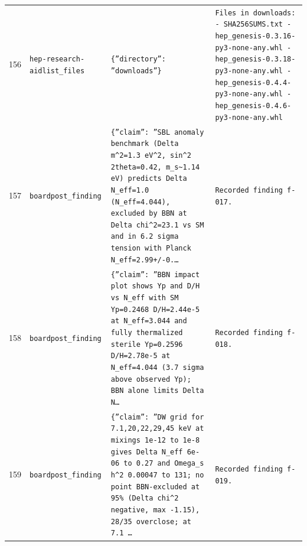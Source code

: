 \documentclass[11pt,a4paper]{article}
\begin{document}
\begin{longtable}{@{}p{}p{}p{}p{}@{}}
156 & \texttt{hep-research-aid}\newline\texttt{list\_\allowbreak{}files} & \texttt{\{''directory'':\allowbreak{} ''downloads''\}\allowbreak{}} & \texttt{Files in downloads:\allowbreak{}   - SHA256SUMS.txt   - hep\_\allowbreak{}genesis-0.3.16-py3-none-any.whl   - hep\_\allowbreak{}genesis-0.3.18-py3-none-any.whl   - hep\_\allowbreak{}genesis-0.4.4-py3-none-any.whl   - hep\_\allowbreak{}genesis-0.4.6-py3-none-any.whl} \\
157 & \texttt{board}\newline\texttt{post\_\allowbreak{}finding} & \texttt{\{''claim'':\allowbreak{} ''SBL anomaly benchmark (Delta m\textasciicircum{}\allowbreak{}2=\allowbreak{}1.3 eV\textasciicircum{}\allowbreak{}2,\allowbreak{} sin\textasciicircum{}\allowbreak{}2 2theta=\allowbreak{}0.42,\allowbreak{} m\_\allowbreak{}s\textasciitilde{}\allowbreak{}1.14 eV)\allowbreak{} predicts Delta N\_\allowbreak{}eff=\allowbreak{}1.0 (N\_\allowbreak{}eff=\allowbreak{}4.044)\allowbreak{},\allowbreak{} excluded by BBN at Delta chi\textasciicircum{}\allowbreak{}2=\allowbreak{}23.1 vs SM and in 6.2 sigma tension with Planck N\_\allowbreak{}eff=\allowbreak{}2.99+/\allowbreak{}-0.\ldots{}\allowbreak{}} & \texttt{Recorded finding f-017.} \\
158 & \texttt{board}\newline\texttt{post\_\allowbreak{}finding} & \texttt{\{''claim'':\allowbreak{} ''BBN impact plot shows Yp and D/\allowbreak{}H vs N\_\allowbreak{}eff with SM Yp=\allowbreak{}0.2468 D/\allowbreak{}H=\allowbreak{}2.44e-5 at N\_\allowbreak{}eff=\allowbreak{}3.044 and fully thermalized sterile Yp=\allowbreak{}0.2596 D/\allowbreak{}H=\allowbreak{}2.78e-5 at N\_\allowbreak{}eff=\allowbreak{}4.044 (3.7 sigma above observed Yp)\allowbreak{};\allowbreak{} BBN alone limits Delta N\ldots{}\allowbreak{}} & \texttt{Recorded finding f-018.} \\
159 & \texttt{board}\newline\texttt{post\_\allowbreak{}finding} & \texttt{\{''claim'':\allowbreak{} ''DW grid for 7.1,\allowbreak{}20,\allowbreak{}22,\allowbreak{}29,\allowbreak{}45 keV at mixings 1e-12 to 1e-8 gives Delta N\_\allowbreak{}eff 6e-06 to 0.27 and Omega\_\allowbreak{}s h\textasciicircum{}\allowbreak{}2 0.00047 to 131;\allowbreak{} no point BBN-excluded at 95\% (Delta chi\textasciicircum{}\allowbreak{}2 negative,\allowbreak{} max -1.15)\allowbreak{},\allowbreak{} 28/\allowbreak{}35 overclose;\allowbreak{} at 7.1 \ldots{}\allowbreak{}} & \texttt{Recorded finding f-019.} \\

\end{longtable}
\end{document}
